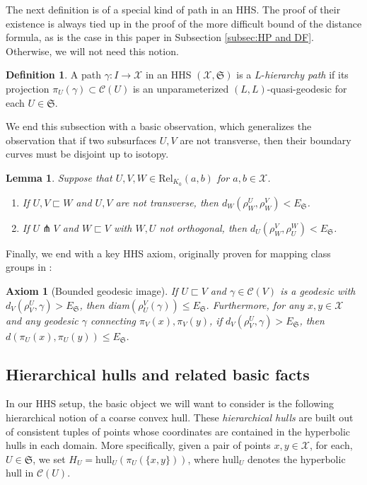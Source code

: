 \documentclass{amsart}
\newtheorem{lemma}[theorem]{Lemma}
\newtheorem{axiom}[theorem]{Axiom}
\theoremstyle{definition}
\newtheorem{definition}[theorem]{Definition}
\theoremstyle{remark}
\theoremstyle{definition}
\newcommand{\calC}{\mathcal{C}}
\newcommand{\calX}{\mathcal{X}}
\newcommand{\ES}{E_{\mathfrak S}}
\newcommand{\Rel}{\mathrm{Rel}}
\newcommand{\hull}{\mathrm{hull}}
\newcommand{\nest}{\sqsubset}
\begin{document}
The next definition is of a special kind of path in an HHS.  The proof of their existence is always tied up in the proof of the more difficult bound of the distance formula, as is the case in this paper in Subsection \ref{subsec:HP and DF}.  Otherwise, we will not need this notion.

\begin{definition}\label{defn:hp}
A path $\gamma:I \to \calX$ in an HHS $(\calX, \mathfrak S)$ is a $L$-\emph{hierarchy path} if its projection $\pi_U(\gamma) \subset \calC(U)$ is an unparameterized $(L,L)$-quasi-geodesic for each $U \in \mathfrak S$.
\end{definition}

We end this subsection with a basic observation, which generalizes the observation that if two subsurfaces $U,V$ are not transverse, then their boundary curves must be disjoint up to isotopy.

\begin{lemma}\label{lem:rho control}
Suppose that $U,V,W \in \Rel_{K_0}(a,b)$ for $a,b \in \calX$.
\begin{enumerate}
\item If $U, V \nest W$ and $U,V$ are not transverse, then $d_W(\rho^U_W, \rho^V_W) < \ES$.
\item If $U \pitchfork V$ and $W \nest V$ with $W,U$ not orthogonal, then $d_U(\rho^V_W, \rho^W_U)<\ES$.
\end{enumerate}
\end{lemma}

Finally, we end with a key HHS axiom, originally proven for mapping class groups in \cite[Theorem 3.1]{MM_II}:

\begin{axiom}[Bounded geodesic image]\label{ax:BGIA}  If $U  \sqsubset V$ and $\gamma \in \calC(V)$ is a geodesic with $d_{V}(\rho^U_V,\gamma)>\ES$, then diam$(\rho^V_U(\gamma))\leq \ES.$ Furthermore, for any $x,y \in \calX$ and any geodesic $\gamma$ connecting $\pi_V(x),\pi_V(y)$, if $d_{V}(\rho^U_V,\gamma)>\ES$, then $d(\pi_U(x), \pi_U(y)) \leq \ES.$
\end{axiom} 

\subsection{Hierarchical hulls and related basic facts}

In our HHS setup, the basic object we will want to consider is the following hierarchical notion of a coarse convex hull.  These \emph{hierarchical hulls} are built out of consistent tuples of points whose coordinates are contained in the hyperbolic hulls in each domain.  More specifically, given a pair of points $x,y \in \calX$, for each, $U \in \mathfrak S$, we set $H_U = \hull_U(\pi_U(\{x,y\}))$, where $\hull_U$ denotes the hyperbolic hull in $\calC(U)$.
\end{document}
